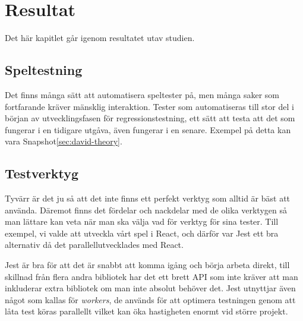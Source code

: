 \section{Resultat}
\label{sec:david-results}
Det här kapitlet går igenom resultatet utav studien.

\subsection{Speltestning}
Det finns många sätt att automatisera speltester på, men många saker som fortfarande kräver mänsklig interaktion. Tester som  automatiseras till stor del i början av utvecklingsfasen för regressionstestning, ett sätt att testa att det som fungerar i en tidigare utgåva, även fungerar i en senare. Exempel på detta kan vara Snapshot\ref{sec:david-theory}. 

\subsection{Testverktyg}
Tyvärr är det ju så att det inte finns ett perfekt verktyg som alltid är bäst att använda. Däremot finns det fördelar och nackdelar med de olika verktygen så man lättare kan veta när man ska välja vad för verktyg för sina tester. Till exempel, vi valde att utveckla vårt spel i React, och därför var Jest ett bra alternativ då det parallellutvecklades med React. 

Jest är bra för att det är snabbt att komma igång och börja arbeta direkt, till skillnad från flera andra bibliotek har det ett brett API som inte kräver att man inkluderar extra bibliotek om man inte absolut behöver det. Jest utnyttjar även något som kallas för \textit{workers}, de används för att optimera testningen genom att låta test köras parallellt vilket kan öka hastigheten enormt vid större projekt.